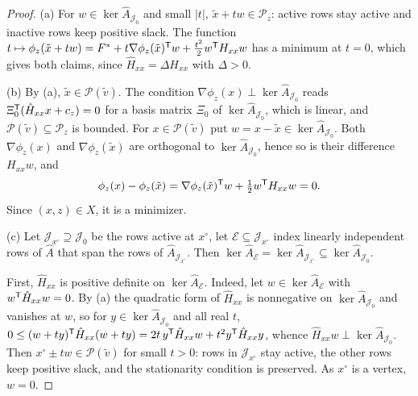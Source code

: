 \begin{proof}
(a) For $w\in\ker\hat A_{\mathcal J_0}$ and small $\lvert t\rvert$,
$\tilde x+tw\in\mathcal P_z$: active rows stay active and inactive rows keep
positive slack. The function
$t\mapsto\phi_z(\tilde x+tw)=F^{*}+t\nabla\phi_z(\tilde x)^{\mathsf T}w+\frac{t^2}{2}w^{\mathsf T}H_{xx}w$
has a minimum at $t=0$, which gives both claims, since
$\hat H_{xx}=\Delta H_{xx}$ with $\Delta>0$.

(b) By (a), $\tilde x\in\mathcal P(\tilde v)$. The condition
$\nabla\phi_z(x)\perp\ker\hat A_{\mathcal J_0}$ reads
$\Xi_0^{\mathsf T}(\hat H_{xx}x+c_z)=0$ for a basis matrix $\Xi_0$ of
$\ker\hat A_{\mathcal J_0}$, which is linear, and
$\mathcal P(\tilde v)\subseteq\mathcal P_z$ is bounded. For
$x\in\mathcal P(\tilde v)$ put $w=x-\tilde x\in\ker\hat A_{\mathcal J_0}$. Both
$\nabla\phi_z(x)$ and $\nabla\phi_z(\tilde x)$ are orthogonal to
$\ker\hat A_{\mathcal J_0}$, hence so is their difference $H_{xx}w$, and
\[
\phi_z(x)-\phi_z(\tilde x)=\nabla\phi_z(\tilde x)^{\mathsf T}w+\tfrac12w^{\mathsf T}H_{xx}w=0 .
\]
Since $(x,z)\in X$, it is a minimizer.

(c) Let $\mathcal J_{x^\circ}\supseteq\mathcal J_0$ be the rows active at
$x^\circ$, let $\mathcal E\subseteq\mathcal J_{x^\circ}$ index linearly
independent rows of $\hat A$ that span the rows of
$\hat A_{\mathcal J_{x^\circ}}$. Then
$\ker\hat A_{\mathcal E}=\ker\hat A_{\mathcal J_{x^\circ}}\subseteq\ker\hat A_{\mathcal J_0}$.

First, $\hat H_{xx}$ is positive definite on $\ker\hat A_{\mathcal E}$. Indeed,
let $w\in\ker\hat A_{\mathcal E}$ with $w^{\mathsf T}\hat H_{xx}w=0$. By (a) the
quadratic form of $\hat H_{xx}$ is nonnegative on $\ker\hat A_{\mathcal J_0}$
and vanishes at $w$, so for $y\in\ker\hat A_{\mathcal J_0}$ and all real $t$,
$0\le(w+ty)^{\mathsf T}\hat H_{xx}(w+ty)=2t\,y^{\mathsf T}\hat H_{xx}w+t^2y^{\mathsf T}\hat H_{xx}y$,
whence $\hat H_{xx}w\perp\ker\hat A_{\mathcal J_0}$. Then
$x^\circ\pm tw\in\mathcal P(\tilde v)$ for small $t>0$: rows in
$\mathcal J_{x^\circ}$ stay active, the other rows keep positive slack, and the
stationarity condition is preserved. As $x^\circ$ is a vertex, $w=0$.


\end{proof}
